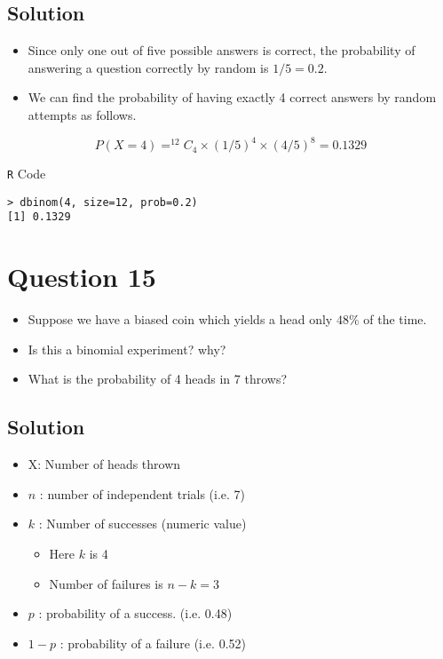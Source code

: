\documentclass[a4paper,12pt]{article}
\begin{document}
\subsection*{Solution}
\begin{itemize}
\item Since only one out of five possible answers is correct, the probability of answering a question correctly by random is $1/5=0.2$. 
\item We can find the probability of having exactly 4 correct answers by random attempts as follows.
\end{itemize}



\[P(X=4) = ^{12}C_4 \times (1/5)^4 \times (4/5)^8 = 0.1329\]

\begin{framed}
\noindent \texttt{R} Code
\begin{verbatim}
> dbinom(4, size=12, prob=0.2)
[1] 0.1329
\end{verbatim}
\end{framed}

\section*{Question 15}
\begin{itemize}
	
	\item Suppose we have a biased coin which yields a head only $48\%$ of the time.
	\item Is this a binomial experiment?  why?
	\item What is the probability of 4 heads in 7 throws?
\end{itemize}

\subsection*{Solution}
	\begin{itemize}
		\item X: Number of heads thrown
		\item $n$ : number of independent trials (i.e. 7)
		\item $k$ : Number of successes (numeric value)
		\begin{itemize}
			\item Here $k$ is 4
			\item Number of failures is $n-k  =3$
		\end{itemize}
		\item $p$ : probability of a success. (i.e. 0.48)
		\item $1-p$ : probability of a failure (i.e. 0.52)
	\end{itemize}
	
\end{document}
